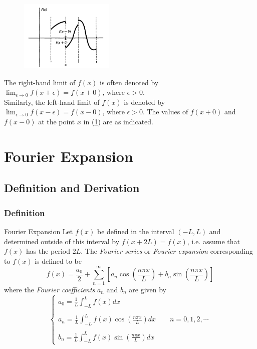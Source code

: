 \documentclass[12pt]{article}
\begin{document}
\renewcommand{\thefigure}{1.2.1}
\begin{figure}[htpb]
    \centering
    \includegraphics[width=0.4\textwidth]{./images/1.2.1}
    \caption{}
    \label{fig:1.2.1}
\end{figure}

The right-hand limit of $f(x)$ is often denoted by $\lim_{\epsilon \to 0} f(x+\epsilon) = f(x+0)$, where $\epsilon > 0$.\\
Similarly, the left-hand limit of $f(x)$ is denoted by $\lim_{\epsilon \to 0} f(x-\epsilon) = f(x-0)$, where $\epsilon > 0$. The values of $f(x+0)$ and $f(x-0)$ at the point $x$ in (\ref{fig:1.2.1}) are as indicated.


\section{Fourier Expansion}

\subsection{Definition and Derivation}
\subsubsection{Definition}
\begin{definition}{Fourier Expansion}{}
    Let $f(x)$ be defined in the interval $(-L,L)$ and determined outside of this interval by $f(x+2L)=f(x)$, i.e. assume that $f(x)$ has the period $2L$. The \textit{Fourier series} or \textit{Fourier expansion} corresponding to $f(x)$ is defined to be
    \begin{equation}
        f(x) = \frac{a_0}{2} + \sum_{n=1}^{\infty} \left[ a_n \cos \left( \frac{n\pi x}{L} \right) + b_n \sin \left( \frac{n\pi x}{L} \right) \right]
    \end{equation}
    where the \textit{Fourier coefficients} $a_n$ and $b_n$ are given by
    \begin{equation}
        \begin{cases}
            \displaystyle 
            a_0 = \frac{1}{L} \int_{-L}^{L} f(x) dx \\\\
            \displaystyle 
            a_n = \frac{1}{L} \int_{-L}^{L} f(x) \cos \left( \frac{n\pi x}{L} \right) dx \qquad n = 0, 1, 2, \cdots \\\\
            \displaystyle 
            b_n = \frac{1}{L} \int_{-L}^{L} f(x) \sin \left( \frac{n\pi x}{L} \right) dx
        \end{cases}
    \end{equation}
\end{definition}
\end{document}
